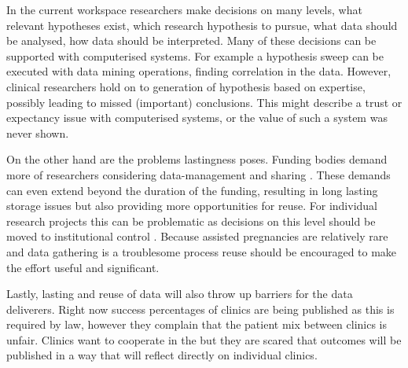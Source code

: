 In the current workspace researchers make decisions on many levels, \eg{} what relevant hypotheses exist, which research hypothesis to pursue, what data should be analysed, how data should be interpreted.
Many of these decisions can be supported with computerised systems.
For example a hypothesis sweep can be executed with data mining operations, finding correlation in the data.
However, clinical researchers hold on to generation of hypothesis based on expertise, possibly leading to missed (important) conclusions.
This might describe a trust or expectancy issue with computerised systems, or the value of such a system was never shown.

On the other hand are the problems lastingness poses.
Funding bodies demand more of researchers considering data-management and sharing \cite{dsb3lynch}.
These demands can even extend beyond the duration of the funding, resulting in long lasting storage issues but also providing more opportunities for reuse.
For individual research projects this can be problematic as decisions on this level should be moved to institutional control \cite{dsb3lynch}.
Because assisted pregnancies are relatively rare and data gathering is a troublesome process reuse should be encouraged to make the effort useful and significant.

Lastly, lasting and reuse of data will also throw up barriers for the data deliverers.
Right now success percentages of clinics are being published as this is required by law, however they complain that the patient mix between clinics is unfair.
Clinics want to cooperate in the \project{} but they are scared that outcomes will be published in a way that will reflect directly on individual clinics.


